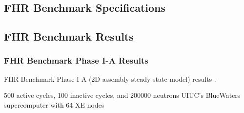 \subsection{FHR Benchmark Specifications}

\subsection{FHR Benchmark Results}

\begin{frame}
    \frametitle{FHR Benchmark Phase I-A Results}
    \begin{table}
        \caption{FHR Benchmark Phase I-A (2D assembly steady state model) results 
        \cite{chee_arfcfhr-benchmark_2021}.}
    \end{table}
    500 active cycles, 100 inactive cycles, and 200000 neutrons
    UIUC's BlueWaters supercomputer with 64 XE nodes
\end{frame}

